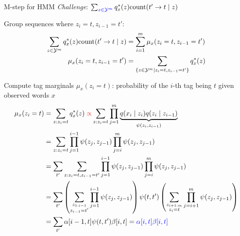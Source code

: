 \documentclass[usenames,dvipsnames,notes,11pt,aspectratio=169]{beamer}
\begin{document}
\begin{frame}
    {M-step for HMM}
    \emph{Challenge}: $\sum_{{\color{blue}z\in\mathcal{Y}^m}} q^*_x(z) \text{count}(t'\rightarrow t\mid z)$

    \vspace{5em}
    
    \begin{center}
    \end{center}
    \vspace{-1em}
    Group sequences where $z_i=t, z_{i-1}=t'$:
    \begin{align*}
    \sum_{{z\in\mathcal{Y}^m}} q^*_x(z) \text{count}(t'\rightarrow t\mid z)
        &= \sum_{i=1}^m \mu_x(z_i=t,z_{i-1}=t')  \\
        \mu_x(z_i=t, z_{i-1}=t') &= \sum_{\left\{ z\in\mathcal{Y}^m \mid z_i=t, z_{i-1}=t' \right\}} q^*_x(z)
    \end{align*}
\end{frame}

\begin{frame}
    {Compute tag marginals}
    $\mu_x(z_i=t)$: probability of the $i$-th tag being $t$ given observed words $x$
    \begin{align*}
        \mu_x(z_i=t) &= \sum_{z: z_i=t} q^*_x(z) \;
        {\color{red}\propto} \sum_{z: z_i=t} \prod_{j=1}^m \underbrace{q(x_i\mid z_i) q(z_i\mid z_{i-1})}_{\psi(z_i,z_{i-1})} \\
        &= \sum_{z: z_i=t} \prod_{j=1}^{i-1}\psi(z_j,z_{j-1})\prod_{j=i}^m\psi(z_j,z_{j-1}) \\
        &= \sum_{t'} \sum_{z: z_i=t,z_{i-1}=t'} \prod_{j=1}^{i-1}\psi(z_j,z_{j-1})\prod_{j=i}^m\psi(z_j,z_{j-1}) \\
        &= \sum_{t'} \left( 
            \sum_{\substack{z_{1:i-1}\\z_{i-1}=t'}}  \prod_{j=1}^{i-1}\psi(z_j,z_{j-1})
         \right)
        \psi(t,t')
        \left( \sum_{\substack{z_{i+1:m}\\z_i=t}} \prod_{j=i+1}^{m}\psi(z_j,z_{j-1})
         \right) \\
        &= \sum_{t'} \alpha[i-1, t] \psi(t,t') \beta[i, t]
        = {\color{blue}\alpha[i,t] \beta[i,t]}
    \end{align*}
\end{frame}
\end{document}
